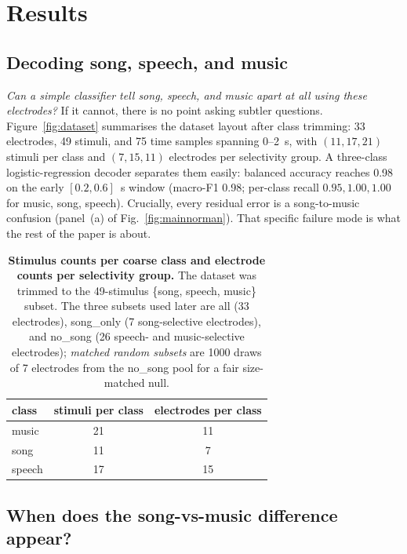 \documentclass[11pt]{article}
\begin{document}
\section{Results}\label{sec:results}

\subsection{Decoding song, speech, and music}

\emph{Can a simple classifier tell song, speech, and music apart at all using these electrodes?} If it cannot, there is no point asking subtler questions. Figure~\ref{fig:dataset} summarises the dataset layout after class trimming: 33 electrodes, 49 stimuli, and 75 time samples spanning 0--2~s, with $(11, 17, 21)$ stimuli per class and $(7, 15, 11)$ electrodes per selectivity group. A three-class logistic-regression decoder separates them easily: balanced accuracy reaches 0.98 on the early $[0.2, 0.6]$~s window (macro-F1 0.98; per-class recall $0.95, 1.00, 1.00$ for music, song, speech). Crucially, every residual error is a song-to-music confusion (panel~(a) of Fig.~\ref{fig:mainnorman}). That specific failure mode is what the rest of the paper is about.

\begin{table}[t]
\centering\small
\caption{\textbf{Stimulus counts per coarse class and electrode counts per selectivity group.} The dataset was trimmed to the 49-stimulus \{song, speech, music\} subset. The three subsets used later are \textsf{all} (33 electrodes), \textsf{song\_only} (7 song-selective electrodes), and \textsf{no\_song} (26 speech- and music-selective electrodes); \emph{matched random subsets} are 1000 draws of 7 electrodes from the \textsf{no\_song} pool for a fair size-matched null.}
\label{tab:divergence}
\begin{tabular}{lcc}
\toprule
class & stimuli per class & electrodes per class \\
\midrule
music  & 21 & 11 \\
song   & 11 & 7 \\
speech & 17 & 15 \\
\bottomrule
\end{tabular}
\end{table}

\subsection{When does the song-vs-music difference appear?}
\end{document}
